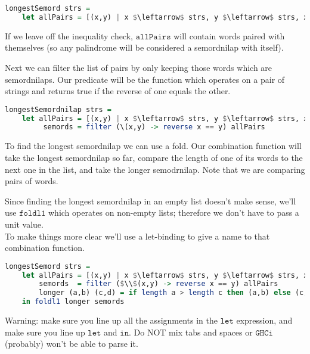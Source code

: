 \documentclass[a4paper,12pt]{article}
\newcommand{\kwa}[1]{\mathtt{#1}}
\begin{document}
\begin{lstlisting}[language=Haskell]
longestSemord strs =
	let allPairs = [(x,y) | x $\leftarrow$ strs, y $\leftarrow$ strs, x /= y]
\end{lstlisting}

\noindent
If we leave off the inequality check, $\kwa{allPairs}$ will contain words paired with themselves (so any palindrome will be considered a semordnilap with itself).

\noindent
Next we can filter the list of pairs by only keeping those words which are semordnilaps. Our predicate will be the function which operates on a pair of strings and returns true if the reverse of one equals the other.

\begin{lstlisting}[language=Haskell]
longestSemordnilap strs =
	let allPairs = [(x,y) | x $\leftarrow$ strs, y $\leftarrow$ strs, x /= y]
	     semords = filter (\(x,y) -> reverse x == y) allPairs
\end{lstlisting}

\noindent
To find the longest semordnilap we can use a fold. Our combination function will take the longest semordnilap so far, compare the length of one of its words to the next one in the list, and take the longer semodrnilap. Note that we are comparing pairs of words.

\noindent
Since finding the longest semordnilap in an empty list doesn't make sense, we'll use $\kwa{foldl1}$ which operates on non-empty lists; therefore we don't have to pass a unit value. \\

\noindent
To make things more clear we'll use a let-binding to give a name to that combination function.

\begin{lstlisting}[language=Haskell]
longestSemord strs =
	let allPairs = [(x,y) | x $\leftarrow$ strs, y $\leftarrow$ strs, x /= y]
        semords  = filter ($\\$(x,y) -> reverse x == y) allPairs
        longer (a,b) (c,d) = if length a > length c then (a,b) else (c,d)
    in foldl1 longer semords
\end{lstlisting}

\noindent
Warning: make sure you line up all the assignments in the $\kwa{let}$ expression, and make sure you line up $\kwa{let}$ and $\kwa{in}$. Do NOT mix tabs and spaces or $\kwa{GHCi}$ (probably) won't be able to parse it. \\
\end{document}
